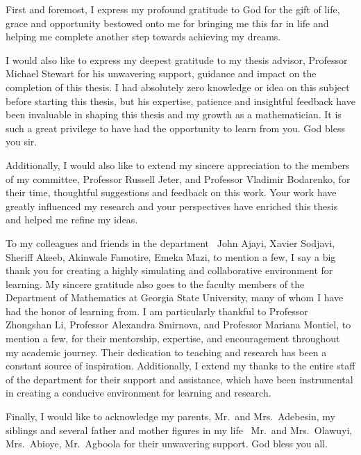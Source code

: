 First and foremost, I express my profound gratitude to God for the gift of life, grace and opportunity bestowed onto me for bringing me this far in life and helping me complete another step towards achieving my dreams.

I would also like to express my deepest gratitude to my thesis advisor, Professor Michael Stewart for his unwavering support, guidance and impact on the completion of this thesis. I had absolutely zero knowledge or idea on this subject before starting this thesis, but his expertise, patience and insightful feedback have been invaluable in shaping this thesis and my growth as a mathematician. It is such a great privilege to have had the opportunity to learn from you. God bless you sir.

Additionally, I would also like to extend my sincere appreciation to the members of my committee, Professor Russell Jeter, and Professor Vladimir Bodarenko, for their time, thoughtful suggestions and feedback on this work. Your work have greatly influenced my research and your perspectives have enriched this thesis and helped me refine my ideas.

To my colleagues and friends in the department \textemdash\, John Ajayi, Xavier Sodjavi, Sheriff Akeeb, Akinwale Famotire, Emeka Mazi, to mention a few, I say a big thank you for creating a highly simulating and collaborative environment for learning. My sincere gratitude also goes to the faculty members of the Department of Mathematics at Georgia State University, many of whom I have had the honor of learning from. I am particularly thankful to Professor Zhongshan Li, Professor Alexandra Smirnova, and Professor Mariana Montiel, to mention a few, for their mentorship, expertise, and encouragement throughout my academic journey. Their dedication to teaching and research has been a constant source of inspiration. Additionally, I extend my thanks to the entire staff of the department for their support and assistance, which have been instrumental in creating a conducive environment for learning and research.

Finally, I would like to acknowledge my parents, Mr.\ and Mrs.\ Adebesin, my siblings and several father and mother figures in my life \textemdash\, Mr.\ and Mrs.\ Olawuyi, Mrs.\ Abioye, Mr.\ Agboola for their unwavering support. God bless you all.



